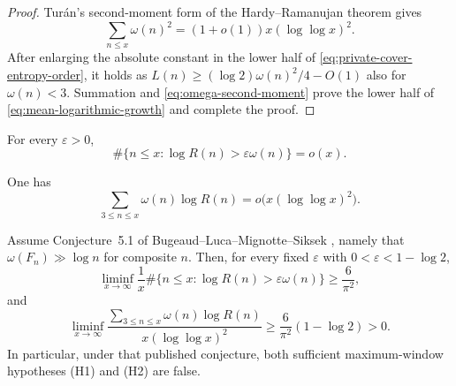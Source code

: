 \begin{proof}
Tur\'an's second-moment form of the Hardy--Ramanujan theorem
\cite{Turan1934HardyRamanujan} gives
\begin{equation}\label{eq:omega-second-moment}
 \sum_{n\le x}\omega(n)^2=(1+o(1))x(\log\log x)^2.
\end{equation}
After enlarging the absolute constant in the lower half of
\eqref{eq:private-cover-entropy-order}, it holds as
$L(n)\ge(\log2)\omega(n)^2/4-O(1)$ also for $\omega(n)<3$.
Summation and \eqref{eq:omega-second-moment} prove the lower half of
\eqref{eq:mean-logarithmic-growth} and complete the proof.
\end{proof}


\begin{definition}
\label{hyp:normal-window}
For every $\varepsilon>0$,
\[
 \#\{n\le x:\log R(n)>\varepsilon\omega(n)\}=o(x).
\tag{H1}
\]
\end{definition}

\begin{definition}
\label{hyp:mean-window}
One has
\[
 \sum_{3\le n\le x}\omega(n)\log R(n)
 =o\bigl(x(\log\log x)^2\bigr).
\tag{H2}
\]
\end{definition}

\begin{proposition}
\label{prop:blms-obstructs-mean-window}
Assume Conjecture~5.1 of Bugeaud--Luca--Mignotte--Siksek
\cite{BugeaudLucaMignotteSiksek2005FewPrimeDivisors}, namely that
$\omega(F_n)\gg\log n$ for composite $n$. Then, for every fixed
$\varepsilon$ with $0<\varepsilon<1-\log2$,
\begin{equation}\label{eq:blms-normal-window-obstruction}
 \liminf_{x\to\infty}\frac1x
 \#\{n\le x:\log R(n)>\varepsilon\omega(n)\}
 \ge\frac6{\pi^2},
\end{equation}
and
\begin{equation}\label{eq:blms-mean-window-obstruction}
 \liminf_{x\to\infty}
 \frac{\sum_{3\le n\le x}\omega(n)\log R(n)}
 {x(\log\log x)^2}
 \ge\frac6{\pi^2}(1-\log2)>0.
\end{equation}
In particular, under that published conjecture, both sufficient
maximum-window hypotheses \textup{(H1)} and \textup{(H2)} are false.
\end{proposition}

